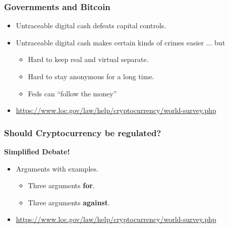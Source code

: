\documentclass{beamer}
\begin{document}
\begin{frame}
  \frametitle{Governments and Bitcoin}
  
\begin{itemize}
	\item Untraceable digital cash defeats capital controls.
	\pause
	\item Untraceable digital cash makes certain kinds of crimes easier ... but \pause
	\begin{itemize}
		\item Hard to keep real and virtual separate.
   		\item Hard to stay anonymous for a long time.
    		\item Feds can ``follow the money''
	\end{itemize}
	\item \url{https://www.loc.gov/law/help/cryptocurrency/world-survey.php}
\end{itemize}
\end{frame}
\begin{frame}
  \frametitle{Should Cryptocurrency be regulated?}
  \textbf{Simplified Debate!}
\begin{itemize}
	\item Arguments with examples.
	\pause
	\begin{itemize}
		\item Three arguments \textbf{for}.
		\item Three arguments \textbf{against}.
	\end{itemize}
	\item \url{https://www.loc.gov/law/help/cryptocurrency/world-survey.php}
\end{itemize}
\end{frame}

\end{document}
